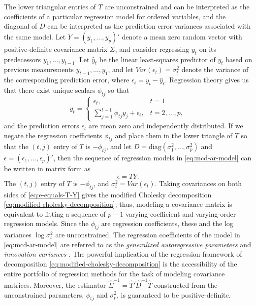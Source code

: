 \documentclass[12pt]{article}
\begin{document}
The lower triangular entries of $T$ are unconstrained and can be interpreted as the coefficients of a particular regression model for ordered variables, and the diagonal of $D$ can be interpreted as the prediction error variances associated with the same model.  Let $Y = \left( y_1,\dots, y_p \right)'$ denote a mean zero random vector with positive-definite covariance matrix $\Sigma$, and consider regressing $y_t$ on its predecessors $y_1, \dots, y_{t-1}$. Let $\hat{y}_t$ be the linear least-squares predictor of $y_t$ based on previous measurements $y_{t-1}, \dots , y_1$, and let $Var\left(\epsilon_t\right) = \sigma_t^2$ denote the variance of the corresponding prediction error, where $\epsilon_t = y_t - \hat{y}_t$. Regression theory gives us that there exist unique scalars $\phi_{tj}$ so that
\begin{equation} \label{eq:mcd-ar-model}
y_t = \left\{ \begin{array}{ll} \epsilon_t, & t = 1\\
\sum_{j = 1}^{t-1} \phi_{tj} y_j + \epsilon_t, & t = 2, \dots, p,
\end{array}\right.
\end{equation}
\noindent
and the prediction errors $\epsilon_t$ are mean zero and independently distributed. If we negate the regression coefficients $\phi_{tj}$ and place them in the lower triangle of $T$ so that the $\left(t, j\right)$ entry of $T$ is $-\phi_{tj}$, and let $D = \mbox{diag}\left(\sigma^2_1, \dots, \sigma_p^2\right)$ and
$\epsilon = \left(\epsilon_1,\dots, \epsilon_p\right)'$, then the sequence of regression models in \eqref{eq:mcd-ar-model} can be written in matrix form as
\begin{equation} \label{eq:e-equals-T-Y}
\epsilon = TY.
\end{equation}
\noindent
The $\left(t, j\right)$ entry of $T$ is $-\phi_{tj}$, and $\sigma_t^2 = Var\left(\epsilon_t\right)$. 
Taking covariances on both sides of \eqref{eq:e-equals-T-Y} gives the modified Cholesky decomposition \eqref{eq:modified-cholesky-decomposition}; thus, modeling a covariance matrix is equivalent to fitting a sequence of $p - 1$ varying-coefficient and varying-order regression models.  Since the $\phi_{tj}$ are regression coefficients, these and the log variances $\log \sigma_t^2$ are unconstrained. The regression coefficients of the model in \eqref{eq:mcd-ar-model} are referred to as the \textit{generalized autoregressive parameters} and \textit{innovation variances} \cite{pourahmadi1999joint,pourahmadi2000maximum}. The powerful implication of the regression framework of decomposition \eqref{eq:modified-cholesky-decomposition} is the accessibility of the entire portfolio of regression methods for the task of modeling covariance matrices. Moreover, the estimator $\hat{\Sigma}^{-1} = \hat{T}' \hat{D}^{-1} \hat{T}$ constructed from the unconstrained parameters, $\phi_{tj}$ and $\sigma_t^2$, is guaranteed to be positive-definite. 
\end{document}
